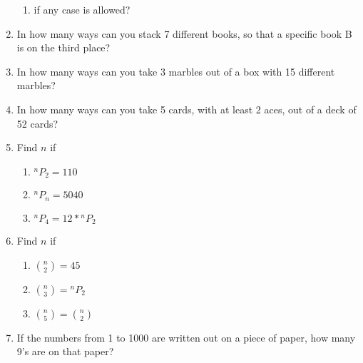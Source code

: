 \documentclass{article}
\newcommand*{\Perm}[2]{{}^{#1}\!P_{#2}}%
\begin{document}
\begin{enumerate}
\begin{enumerate}
  \item if any case is allowed?
  \end{enumerate}
\item In how many ways can you stack 7 different books, so that a specific book B is on the third place?
\item In how many ways can you take 3 marbles out of a box with 15 different marbles?
\item In how many ways can you take 5 cards, with at least 2 aces, out of a deck of 52 cards?
\item Find $n$ if
  \begin{enumerate}
  \item $\Perm{n}{2} = 110$
  \item $\Perm{n}{n} = 5040$
  \item $\Perm{n}{4} = 12 * \Perm{n}{2}$
  \end{enumerate}
\item Find $n$ if
  \begin{enumerate}
  \item ${n \choose 2} = 45$
  \item ${n \choose 3} = \Perm{n}{2}$
  \item ${n \choose 5} = {n \choose 2}$
  \end{enumerate}
\item If the numbers from 1 to 1000 are written out on a piece of paper, how many 9's are on that paper?
\end{enumerate}
\end{document}
